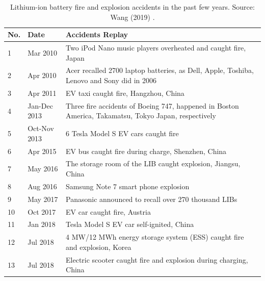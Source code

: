 \begin{table}[ht]
    \centering
        \begin{footnotesize}
            \begin{tabular}{|p{7mm} p{22mm} p{113mm}|}
                \hline
                \rowcolor{bluepoli!40}
                \textbf{No.} & \textbf{Date} & \textbf{Accidents Replay}\T\B \\
                \hline \hline
                1 & Mar 2010 & Two iPod Nano music players overheated and caught fire, Japan\T\B\\
                2 & Apr 2010 & Acer recalled 2700 laptop batteries, as Dell, Apple, Toshiba, Lenovo and Sony did in 2006\T\B\\
                3 & Apr 2011 & EV taxi caught fire, Hangzhou, China\T\B\\
                4 & Jan-Dec 2013 & Three fire accidents of Boeing 747, happened in Boston America, Takamatsu, Tokyo Japan, respectively\T\B\\
                5 & Oct-Nov 2013 & 6 Tesla Model S EV cars caught fire\T\B\\
                6 & Apr 2015 & EV bus caught fire during charge, Shenzhen, China\T\B\\
                7 & May 2016 & The storage room of the LIB caught explosion, Jiangsu, China\T\B\\
                8 & Aug 2016 & Samsung Note 7 smart phone explosion\T\B\\
                9 & May 2017 & Panasonic announced to recall over 270 thousand LIBs\T\B\\
                10 & Oct 2017 & EV car caught fire, Austria\T\B\\
                11 & Jan 2018 & Tesla Model S EV car self-ignited, China\T\B\\
                12 & Jul 2018 & 4 MW/12 MWh energy storage system (ESS) caught fire and explosion, Korea\T\B\\
                13 & Jul 2018 & Electric scooter caught fire and explosion during charging, China\T\B\\
                \hline
                \end{tabular}
                \\[10pt]
                \caption[Lithium-ion battery accidents]{Lithium-ion battery fire and explosion accidents in the past few years. Source: Wang (2019) \cite{wang2019review}.}
                \label{table:accidents}
        \end{footnotesize}
\end{table}


